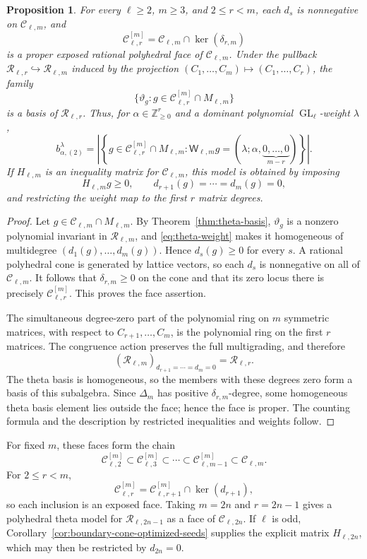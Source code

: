 \documentclass[11pt]{amsart}
\newtheorem{proposition}[theorem]{Proposition}
\theoremstyle{definition}
\theoremstyle{remark}
\newcommand{\GL}{\operatorname{GL}}
\newcommand{\cR}{\mathcal R}
\begin{document}
\begin{proposition}\label{prop:successive-matrix-face}
For every $\ell\ge2$, $m\ge3$, and $2\le r<m$, each $d_s$ is nonnegative
on $\mathscr C_{\ell,m}$, and
\[ \mathscr C_{\ell,r}^{[m]}=\mathscr C_{\ell,m}\cap\ker(\delta_{r,m}) \]
is a proper exposed rational polyhedral face of $\mathscr C_{\ell,m}$.  Under the
pullback $\cR_{\ell,r}\hookrightarrow\cR_{\ell,m}$ induced by the
projection $(C_1,\ldots,C_m)\mapsto(C_1,\ldots,C_r)$, the family
\[ \{\vartheta_g:g\in\mathscr C_{\ell,r}^{[m]}\cap M_{\ell,m}\} \]
is a basis of $\cR_{\ell,r}$.  Thus, for
$\alpha\in\mathbb Z_{\ge0}^r$ and a dominant polynomial
$\GL_\ell$-weight $\lambda$,
\[
 b_{\alpha,(2)}^\lambda
 =\left|\left\{g\in\mathscr C_{\ell,r}^{[m]}\cap M_{\ell,m}:
 \mathsf W_{\ell,m}g=
 (\lambda;\alpha,\underbrace{0,\ldots,0}_{m-r})\right\}\right|.
\]
If $H_{\ell,m}$ is an inequality matrix for $\mathscr C_{\ell,m}$, this
model is obtained by imposing
\[ H_{\ell,m}g\ge0,\qquad d_{r+1}(g)=\cdots=d_m(g)=0, \]
and restricting the weight map to the first $r$ matrix degrees.
\end{proposition}

\begin{proof}
Let $g\in\mathscr C_{\ell,m}\cap M_{\ell,m}$.  By
Theorem~\ref{thm:theta-basis}, $\vartheta_g$ is a nonzero polynomial
invariant in $\cR_{\ell,m}$, and
\eqref{eq:theta-weight} makes it homogeneous of multidegree
$(d_1(g),\ldots,d_m(g))$.  Hence $d_s(g)\ge0$ for every $s$.  A rational
polyhedral cone is generated by lattice vectors, so each $d_s$ is
nonnegative on all of $\mathscr C_{\ell,m}$.  It follows that
$\delta_{r,m}\ge0$ on the cone and that its zero locus there is precisely
$\mathscr C_{\ell,r}^{[m]}$.  This proves the face assertion.

The simultaneous degree-zero part of the polynomial ring on $m$ symmetric
matrices, with respect to $C_{r+1},\ldots,C_m$, is the polynomial ring on
the first $r$ matrices.  The congruence action preserves the full
multigrading, and therefore
\[ (\cR_{\ell,m})_{d_{r+1}=\cdots=d_m=0}=\cR_{\ell,r}. \]
The theta basis is homogeneous, so the members with these degrees zero form
a basis of this subalgebra.  Since $\Delta_m$ has positive
$\delta_{r,m}$-degree, some homogeneous theta basis element lies outside the
face; hence the face is proper.  The counting formula and the description by
restricted inequalities and weights follow.
\end{proof}

For fixed $m$, these faces form the chain
\[ \mathscr C_{\ell,2}^{[m]}\subset\mathscr C_{\ell,3}^{[m]}\subset\cdots\subset\mathscr C_{\ell,m-1}^{[m]}\subset\mathscr C_{\ell,m}. \]
For $2\le r<m$,
\[ \mathscr C_{\ell,r}^{[m]}=\mathscr C_{\ell,r+1}^{[m]}\cap\ker(d_{r+1}), \]
so each inclusion is an exposed face.  Taking $m=2n$ and $r=2n-1$ gives a
polyhedral theta model for $\cR_{\ell,2n-1}$ as a face of
$\mathscr C_{\ell,2n}$.  If $\ell$ is odd,
Corollary~\ref{cor:boundary-cone-optimized-seeds} supplies the explicit
matrix $H_{\ell,2n}$, which may then be restricted by $d_{2n}=0$.
\end{document}
